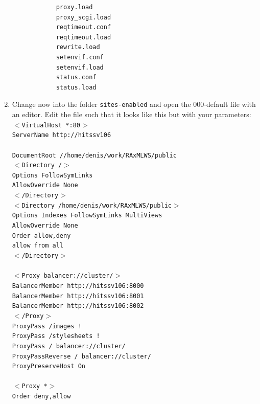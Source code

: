 \documentclass{scrartcl}
\begin{document}
\begin{enumerate}
			\begin{verbatim}
			proxy.load
			proxy_scgi.load
			reqtimeout.conf
			reqtimeout.load
			rewrite.load
			setenvif.conf
			setenvif.load
			status.conf
			status.load
			\end{verbatim}
			
			\item Change now into the folder \texttt{sites-enabled} and open the 000-default file with an editor. Edit the file such that it looks like this but with your parameters: \\
			\texttt{$<$VirtualHost *:80$>$ \\
  					ServerName http://hitssv106\\
					\\
  					DocumentRoot //home/denis/work/RAxMLWS/public\\
  					$<$Directory /$>$\\
    				Options FollowSymLinks\\
    				AllowOverride None\\
  					$<$/Directory$>$\\
  					$<$Directory /home/denis/work/RAxMLWS/public$>$\\
    				Options Indexes FollowSymLinks MultiViews\\
    				AllowOverride None\\
    				Order allow,deny\\
    				allow from all\\
  					$<$/Directory$>$\\
					\\
  					$<$Proxy balancer://cluster/$>$\\
         			BalancerMember http://hitssv106:8000\\
         			BalancerMember http://hitssv106:8001\\
         			BalancerMember http://hitssv106:8002\\
  					$<$/Proxy$>$\\
  					ProxyPass /images !\\
  					ProxyPass /stylesheets !\\
  					ProxyPass / balancer://cluster/\\
 					ProxyPassReverse / balancer://cluster/\\
  					ProxyPreserveHost On\\
					\\
  					$<$Proxy *$>$\\
    				Order deny,allow\\
}
\end{enumerate}
\end{document}
